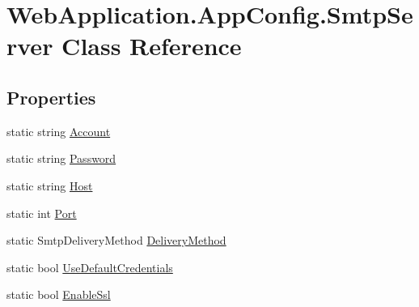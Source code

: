 \hypertarget{classWebApplication_1_1AppConfig_1_1SmtpServer}{}\section{Web\+Application.\+App\+Config.\+Smtp\+Server Class Reference}
\label{classWebApplication_1_1AppConfig_1_1SmtpServer}
\subsection*{Properties}
\begin{DoxyCompactItemize}
\item 
static string \mbox{\hyperlink{classWebApplication_1_1AppConfig_1_1SmtpServer_a2e27e5acbfb3359f885c0bc8cff8e0d8}{Account}}
\item 
static string \mbox{\hyperlink{classWebApplication_1_1AppConfig_1_1SmtpServer_aa4e53dc8a8dc1806f8461786dd5e978f}{Password}}
\item 
static string \mbox{\hyperlink{classWebApplication_1_1AppConfig_1_1SmtpServer_a70a411ad1fd0bcdd132bd62ac185a0ad}{Host}}
\item 
static int \mbox{\hyperlink{classWebApplication_1_1AppConfig_1_1SmtpServer_a7d6efdd38867b3eec77ada1bc984dbbf}{Port}}
\item 
static Smtp\+Delivery\+Method \mbox{\hyperlink{classWebApplication_1_1AppConfig_1_1SmtpServer_a6258a58f9b6455767d65a2e590debe5c}{Delivery\+Method}}
\item 
static bool \mbox{\hyperlink{classWebApplication_1_1AppConfig_1_1SmtpServer_a12805019c21ec023c97a6bdc2c3b9273}{Use\+Default\+Credentials}}
\item 
static bool \mbox{\hyperlink{classWebApplication_1_1AppConfig_1_1SmtpServer_aca5e2c90bb180c5362974f39b3d091a2}{Enable\+Ssl}}
\end{DoxyCompactItemize}
